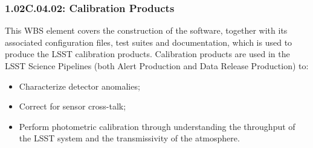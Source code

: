 \subsubsection*{1.02C.04.02: Calibration Products}

This WBS element covers the construction of the software, together with
its associated configuration files, test suites and documentation, which
is used to produce the LSST calibration products. Calibration products
are used in the LSST Science Pipelines (both Alert Production and Data
Release Production) to:

\begin{itemize}

\item{Characterize detector anomalies;}
\item{Correct for sensor cross-talk;}
\item{Perform photometric calibration through understanding the throughput of
      the LSST system and the transmissivity of the atmosphere.}

\end{itemize}
